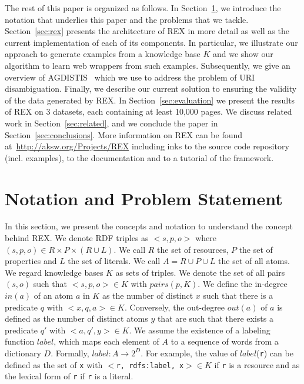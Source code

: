 \documentclass{llncs}
\newcommand{\labf}[0]{\ensuremath{label}}
\begin{document}
The rest of this paper is organized as follows. In Section~\ref{sec:notation}, we introduce the notation that underlies this paper and the problems that we tackle. Section~\ref{sec:rex} presents the architecture of REX in more detail as well as the current implementation of each of its components.
In particular, we illustrate our approach to generate examples from a knowledge base $K$ and we show our algorithm to learn web wrappers from such examples.
Subsequently, we give an overview of AGDISTIS~\cite{Usbeck2014} which we use to address the problem of URI disambiguation. 
Finally, we describe our current solution to ensuring the validity of the data generated by REX. 
In Section~\ref{sec:evaluation} we present the results of REX on 3 datasets, each containing at least 10,000 pages. 
We discuss related work in Section~\ref{sec:related}, and we conclude the paper in Section~\ref{sec:conclusions}. 
More information on REX can be found at~\url{http://aksw.org/Projects/REX} including inks to the source code repository (incl. examples), to the documentation and to a tutorial of the framework.

\section{Notation and Problem Statement}
\label{sec:notation}
In this section, we present the concepts and notation to understand the concept behind REX. We denote RDF triples as $<s, p, o>$ where $(s, p, o) \in R \times P \times (R \cup L)$. We call $R$ the set of resources, $P$ the set of properties and $L$ the set of literals. We call $A = R \cup P \cup L$ the set of all atoms. We regard knowledge bases $K$ as sets of triples. We denote the set of all pairs $(s, o)$ such that $<s, p, o> \in K$ with $pairs(p, K)$.
We define the in-degree $in(a)$ of an atom $a$ in $K$ as the number of distinct $x$ such that there is a predicate $q$ with $<x, q, a> \in K$. Conversely, the out-degree $out(a)$ of $a$ is defined as the number of distinct atoms $y$ that are such that there exists a predicate $q'$ with $<a, q', y> \in K$.
We assume the existence of a labeling function $\labf$, which maps each element of $A$ to a sequence of words from a dictionary $D$. Formally, $\labf: A \rightarrow 2^D$. For example, the value of $\labf$(\texttt{r}) can be defined as the set of \texttt{x} with $<$\texttt{r, rdfs:label, x}$> \in K$ if \texttt{r} is a resource and as the lexical form of  \texttt{r} if  \texttt{r} is a literal.
\end{document}

